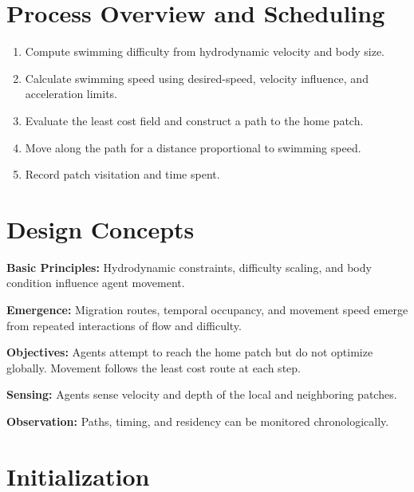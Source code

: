 \documentclass[
]{book}
\begin{document}
\section{Process Overview and Scheduling}\label{process-overview-and-scheduling-7}

\begin{enumerate}
\def\labelenumi{\arabic{enumi}.}
\item
  Compute swimming difficulty from hydrodynamic velocity and body
  size.
\item
  Calculate swimming speed using desired-speed, velocity influence,
  and acceleration limits.
\item
  Evaluate the least cost field and construct a path to the home
  patch.
\item
  Move along the path for a distance proportional to swimming speed.
\item
  Record patch visitation and time spent.
\end{enumerate}

\section{Design Concepts}\label{design-concepts-7}

\textbf{Basic Principles:} Hydrodynamic constraints, difficulty scaling, and
body condition influence agent movement.

\textbf{Emergence:} Migration routes, temporal occupancy, and movement speed
emerge from repeated interactions of flow and difficulty.

\textbf{Objectives:} Agents attempt to reach the home patch but do not
optimize globally. Movement follows the least cost route at each step.

\textbf{Sensing:} Agents sense velocity and depth of the local and
neighboring patches.

\textbf{Observation:} Paths, timing, and residency can be monitored
chronologically.

\section{Initialization}\label{initialization-7}
\end{document}
